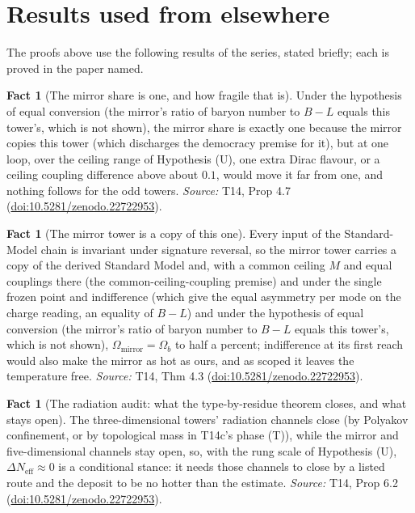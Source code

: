 \documentclass[11pt]{article}
\theoremstyle{definition}
\newtheorem{fact}[theorem]{Fact}
\theoremstyle{plain}
\begin{document}
\section{Results used from elsewhere}
The proofs above use the following results of the series, stated briefly; each is proved in the paper named.

\begin{fact}[The mirror share is one, and how fragile that is]\label{c:dark-matter.mirror-share-one-how-fragile}
Under the hypothesis of equal conversion (the mirror's ratio of baryon number to $B - L$ equals this tower's, which is not shown), the mirror share is exactly one because the mirror copies this tower (which discharges the democracy premise for it), but at one loop, over the ceiling range of Hypothesis (U), one extra Dirac flavour, or a ceiling coupling difference above about $0.1$, would move it far from one, and nothing follows for the odd towers.
\emph{Source:} T14, Prop 4.7 (\href{https://doi.org/10.5281/zenodo.22722953}{doi:10.5281/zenodo.22722953}).
\end{fact}

\begin{fact}[The mirror tower is a copy of this one]\label{c:dark-matter.mirror-tower-copy-one}
Every input of the Standard-Model chain is invariant under signature reversal, so the mirror tower carries a copy of the derived Standard Model and, with a common ceiling $M$ and equal couplings there (the common-ceiling-coupling premise) and under the single frozen point and indifference (which give the equal asymmetry per mode on the charge reading, an equality of $B - L$) and under the hypothesis of equal conversion (the mirror's ratio of baryon number to $B - L$ equals this tower's, which is not shown), $\Omega_{\mathrm{mirror}} = \Omega_{b}$ to half a percent; indifference at its first reach would also make the mirror as hot as ours, and as scoped it leaves the temperature free.
\emph{Source:} T14, Thm 4.3 (\href{https://doi.org/10.5281/zenodo.22722953}{doi:10.5281/zenodo.22722953}).
\end{fact}

\begin{fact}[The radiation audit: what the type-by-residue theorem closes, and what stays open]\label{c:dark-matter.radiation-audit-what-theorem-closes-what}
The three-dimensional towers' radiation channels close (by Polyakov confinement, or by topological mass in T14c's phase (T)), while the mirror and five-dimensional channels stay open, so, with the rung scale of Hypothesis (U), $\Delta N_{\mathrm{eff}} \approx 0$ is a conditional stance: it needs those channels to close by a listed route and the deposit to be no hotter than the estimate.
\emph{Source:} T14, Prop 6.2 (\href{https://doi.org/10.5281/zenodo.22722953}{doi:10.5281/zenodo.22722953}).
\end{fact}
\end{document}
